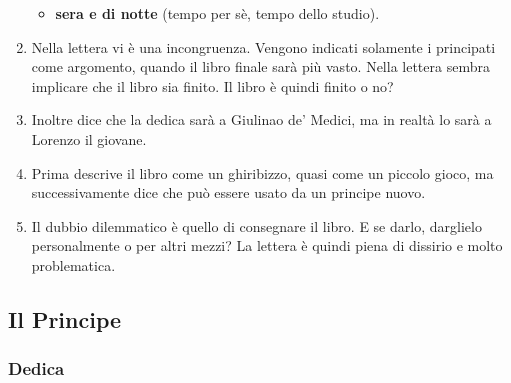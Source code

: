 \documentclass{article}
\begin{document}
\begin{enumerate}
\begin{itemize}
        \item \textbf{sera e di notte} (tempo per sè, tempo dello studio).
    \end{itemize}
    \item Nella lettera vi è una incongruenza. Vengono indicati solamente i principati come argomento, quando il libro finale sarà
    più vasto. Nella lettera sembra implicare che il libro sia finito. Il libro è quindi finito o no?
    \item Inoltre dice che la dedica sarà a Giulinao de' Medici, ma in realtà lo sarà a Lorenzo il giovane.
    \item Prima descrive il libro come un ghiribizzo, quasi come un piccolo gioco, ma successivamente dice
    che può essere usato da un principe nuovo.
    \item Il dubbio dilemmatico è quello di consegnare il libro. E se darlo, darglielo personalmente o per altri
    mezzi? La lettera è quindi piena di dissirio e molto problematica.
\end{enumerate}

\newpage
\subsection{Il Principe}
\subsubsection{Dedica}
\end{document}
